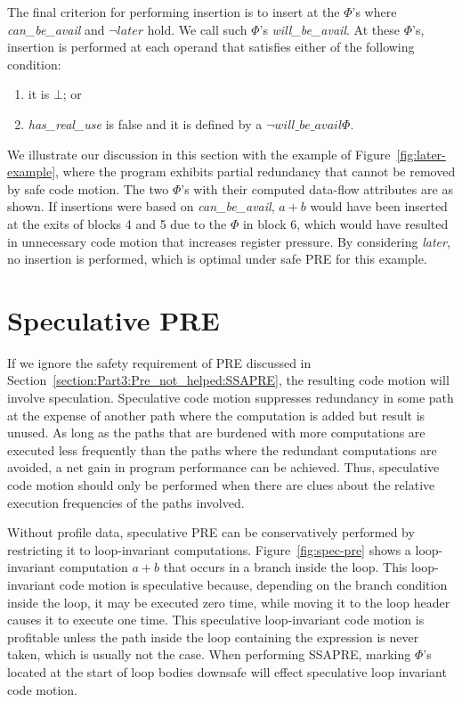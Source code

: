 The final criterion for performing insertion is to insert at the $\Phi$'s where 
\emph{can\_be\_avail} and $\neg later$ hold.  We call such $\Phi$'s
\emph{will\_be\_avail}.  At these $\Phi$'s,
insertion is performed at each operand that satisfies either of the following
condition:
\begin{enumerate}
\item it is $\bot$; or
\item \emph{has\_real\_use} is false and it is defined by a 
$\neg will\_be\_avail \Phi$.
\end{enumerate}

We illustrate our discussion in this section with the example of 
Figure~\ref{fig:later-example}, where the program exhibits partial redundancy
that cannot be removed by safe code motion.  The two $\Phi$'s with their 
computed data-flow attributes are as shown.  If insertions were based on
\emph{can\_be\_avail}, $a+b$ would have been inserted at the exits of 
blocks 4 and 5 due to the $\Phi$ in block 6,
which would have resulted in unnecessary code motion that increases
register pressure.  By considering \emph{later}, no insertion is performed,
which is optimal under safe PRE for this example.
 
\section{Speculative PRE}

If we ignore the safety requirement of PRE discussed in 
Section~\ref{section:Part3:Pre_not_helped:SSAPRE}, the resulting code motion
will involve speculation.  Speculative code motion suppresses
redundancy in some path at the expense of another path where the computation 
is added but result is unused.  As long as the paths that are burdened with
more computations are executed less frequently than the paths where the
redundant computations are avoided, a net gain in program performance can be
achieved.  Thus, speculative code motion should only be performed when there
are clues about the relative execution frequencies of the paths involved.

Without profile data, speculative PRE can be conservatively performed by
restricting it to loop-invariant computations.  
Figure~\ref{fig:spec-pre} shows
a loop-invariant computation $a+b$ that occurs in a branch inside the loop.
This loop-invariant code motion is speculative because, depending on the
branch condition inside the loop, it may be executed zero time, while moving it
to the loop header causes it to execute one time. This speculative 
loop-invariant code motion is profitable unless the path inside the loop
containing the expression is never taken, which is usually not the case.
When performing SSAPRE, marking $\Phi$'s located at the start of loop bodies
downsafe will effect speculative loop invariant code motion. 

